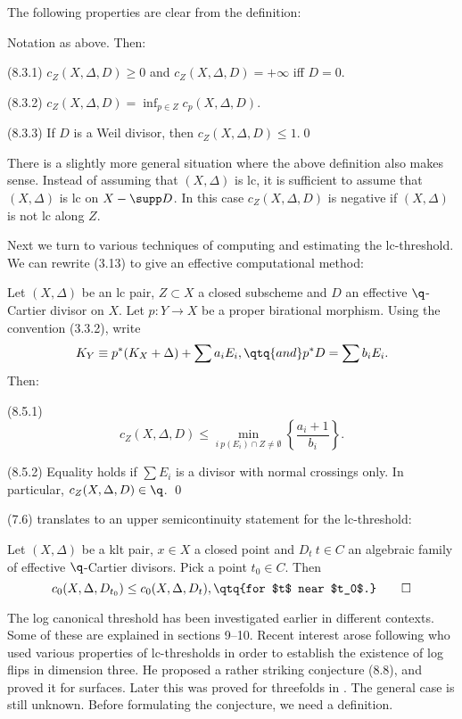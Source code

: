 The following  properties  are clear from the definition:

  Notation as above. Then:

(8.3.1) $c_Z(X,\Delta,D)\geq 0$ and  $c_Z(X,\Delta,D)=+\infty$ iff $D=0$.

(8.3.2) $c_Z(X,\Delta,D)=\inf_{p\in Z} c_p(X,\Delta,D)$.

(8.3.3) If $D$ is a Weil divisor, then $c_Z(X,\Delta,D)\leq 1$.\qed
\endproclaim


 There is a slightly more general situation where the above
definition also makes sense. Instead of assuming that $(X,\Delta)$ is lc, it
is sufficient to assume that $(X,\Delta)$ is lc on $X-\supp D$. In this  case
$c_Z(X,\Delta,D)$ is negative if $(X,\Delta)$ is not lc along $Z$.
\enddemo


Next we turn to various techniques of computing and estimating the
lc-threshold.
 We can rewrite (3.13) to give an effective computational method:


  Let $(X,\Delta)$ be an lc pair, $Z\subset X$ a
closed subscheme and $D$ an effective $\q$-Cartier divisor on $X$.    Let
$p:Y\to X$ be a proper birational   morphism. Using the convention (3.3.2),
write
$$
K_Y\equiv p^*(K_X+\Delta)+\sum a_iE_i,\qtq{and} p^*D=\sum b_iE_i.
$$
 Then:

(8.5.1) 
$$
c_Z(X,\Delta,D)\leq \min_{i\:p(E_i)\cap Z\neq \emptyset}
\left\{\frac{a_i+1}{b_i}\right\}.
$$

(8.5.2) Equality holds if $\sum E_i$ is a divisor with normal crossings
only. In particular, $c_Z(X,\Delta,D)\in \q$. \qed
\endproclaim

(7.6) translates to an upper semicontinuity statement for the lc-threshold:

 Let $(X,\Delta)$ be a klt pair, $x\in X$ a closed point
and $D_t\:t\in C$ an algebraic family of effective  $\q$-Cartier divisors.
Pick a point $t_0\in C$. Then
$$
c_0(X,\Delta, D_{t_0})\leq c_0(X,\Delta, D_{t}),\qtq{for $t$ near $t_0$.}\qed
$$
\endproclaim


The log canonical threshold has been investigated earlier in different
contexts. Some of these are explained in sections 9--10. Recent interest
arose following \cite{Shokurov92}  who used various properties of
lc-thresholds in order to establish the existence of log flips in dimension
three.  He proposed a rather striking conjecture (8.8), and proved it for
surfaces. Later this was proved for threefolds in \cite{Alexeev93}. The
general case is still unknown.  Before formulating the conjecture, we need a
definition.


